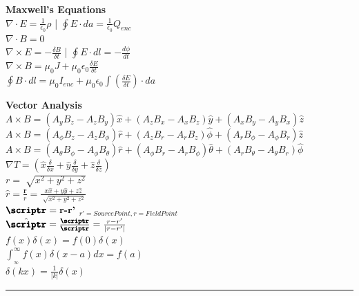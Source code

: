 \documentclass[1pt]{report}
\begin{document}
\begin{multicols}{3}
\begin{flushleft}

\begin{mdframed}
\textbf{Maxwell's Equations}\\
$\nabla\cdot E=\frac{1}{\epsilon_0}\rho$ | $\oint E\cdot da=\frac{1}{\epsilon_0}Q_{enc}$\\
$\nabla\cdot B=0$\\
$\nabla\times E=-\frac{\delta B}{\delta t}$ | $\oint E\cdot dl=-\frac{d\phi}{dt}$\\
$\nabla\times B=\mu_0J+\mu_0\epsilon_0\frac{\delta E}{\delta t}$\\
$\oint B\cdot dl=\mu_0 I_{enc}+\mu_0\epsilon_0\int(\frac{\delta E}{\delta t})\cdot da$\\
\end{mdframed}

\textbf{Vector Analysis}\\
$A\times B=(A_yB_z-A_zB_y)\hat{x}+(A_zB_x-A_xB_z)\hat{y}+(A_xB_y-A_yB_x)\hat{z}$\\
$A\times B=(A_\phi B_z-A_zB_\phi )\hat{r}+(A_zB_r-A_rB_z)\hat{\phi }+(A_rB_\phi -A_\phi B_r)\hat{z}$\\
$A\times B=(A_\theta B_\phi -A_\phi B_\theta )\hat{r}+(A_\phi B_r-A_rB_\phi)\hat{\theta }+(A_rB_\theta -A_\theta B_r)\hat{\phi}$\\
$\nabla T=(\hat{x}\frac{\delta}{\delta x}+\hat{y}\frac{\delta}{\delta y}+\hat{z}\frac{\delta}{\delta z})$\\
$r=\sqrt[]{x^2+y^2+z^2}$\\
$\hat{r}=\frac{\textbf{r}}{r}=\frac{x\hat{x}+y\hat{y}+z\hat{z}}{\sqrt[]{x^2+y^2+z^2}}$\\
$\pmb{\scriptr}=\textbf{r-r'}$ $_{r'=SourcePoint,r=FieldPoint}$\\
$\hat{{\pmb{\scriptr}}}=\frac{{\pmb{\scriptr}}}{{\pmb{\scriptr}}}=\frac{r-r'}{|r-r'|}$\\
$f(x)\delta(x)=f(0)\delta(x)$\\
$\int_{_\infty}^{\infty}f(x)\delta(x-a)dx=f(a)$\\
$\delta(kx)=\frac{1}{|k|}\delta(x)$\\

\noindent\rule[0.5ex]{\linewidth}{1pt}


\end{flushleft}
\end{multicols}
\end{document}
